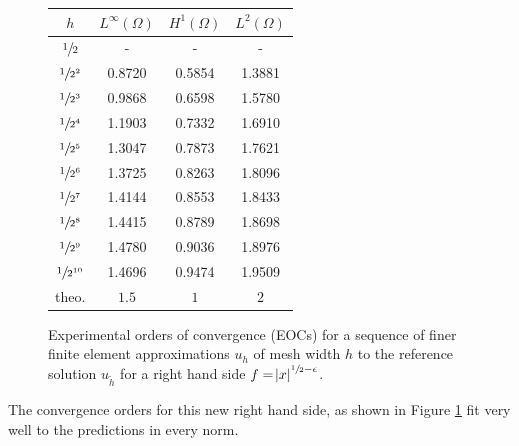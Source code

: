 \documentclass[headsepline,footsepline,footinclude=false,oneside,fontsize=11pt,paper=a4,listof=totoc,bibliography=totoc]{scrbook} %
\begin{document}
\begin{figure}
	\centering
	\bgroup
	\def\arraystretch{1.3}
	\begin{tabular}{cccc}
		\hline
		$h$ & $L^\infty(\Omega)$ & $H^1(\Omega)$ & $L^2(\Omega)$ \\
		\hline
		$\sfrac{1}{2}$      &	-		&		-		&		- \\
		$\sfrac{1}{2^2}$	&	\num{0.8720}		&		\num{0.5854}		&		\num{1.3881} \\
		$\sfrac{1}{2^3}$	&	\num{0.9868}		&		\num{0.6598}		&		\num{1.5780} \\
		$\sfrac{1}{2^4}$	&	\num{1.1903}		&		\num{0.7332}		&		\num{1.6910} \\
		$\sfrac{1}{2^5}$	&	\num{1.3047}		&		\num{0.7873}		&		\num{1.7621} \\
		$\sfrac{1}{2^6}$	&	\num{1.3725}		&		\num{0.8263}		&		\num{1.8096} \\
		$\sfrac{1}{2^7}$	&	\num{1.4144}		&		\num{0.8553}		&		\num{1.8433} \\
		$\sfrac{1}{2^8}$	&	\num{1.4415}		&		\num{0.8789}		&		\num{1.8698} \\
		$\sfrac{1}{2^9}$	&	\num{1.4780}		&		\num{0.9036}		&		\num{1.8976} \\
		$\sfrac{1}{2^{10}}$	&	\num{1.4696}		&		\num{0.9474}		&		\num{1.9509} \\
		\hline	
		theo. & $1.5$ & $1$ & $2$
	\end{tabular}
	\egroup
	\caption[EOCs for  $f = \abs{x}^{\sfrac{1}{2} - \epsilon}$]{Experimental orders of convergence (EOCs) for a sequence of finer finite element approximations $u_h$ of mesh width $h$ to the reference solution $u_{\tilde{h}}$ for a right hand side $f = \abs{x}^{\sfrac{1}{2} - \epsilon}$.}
	\label{fig:eocs_L2}
\end{figure}

The convergence orders for this new right hand side, as shown in Figure \ref{fig:eocs_L2} fit very well to the predictions in every norm.

\listoffigures{}


\printbibliography{}
\end{document}
